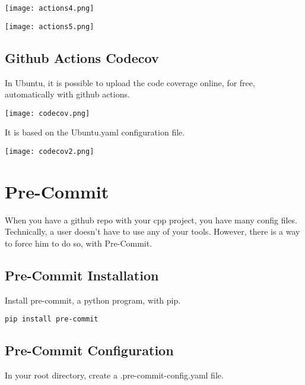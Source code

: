 \begin{center}
    \texttt{[image: actions4.png]}
\end{center}


\begin{center}
    \texttt{[image: actions5.png]}
\end{center}


\subsection{Github Actions Codecov}

In Ubuntu, it is possible to upload the code coverage online, for free, automatically with github actions.

\begin{center}
    \texttt{[image: codecov.png]}
\end{center}

It is based on the Ubuntu.yaml configuration file.

\begin{center}
    \texttt{[image: codecov2.png]}
\end{center}



\section{Pre-Commit}

When you have a github repo with your cpp project, you have many config files. Technically,
a user doesn't have to use any of your tools. However, there is a way to force him to do so, with 
Pre-Commit.


\subsection{Pre-Commit Installation}

Install pre-commit, a python program, with pip.

\begin{verbatim}
pip install pre-commit
\end{verbatim}


\subsection{Pre-Commit Configuration}

In your root directory, create a .pre-commit-config.yaml file.

